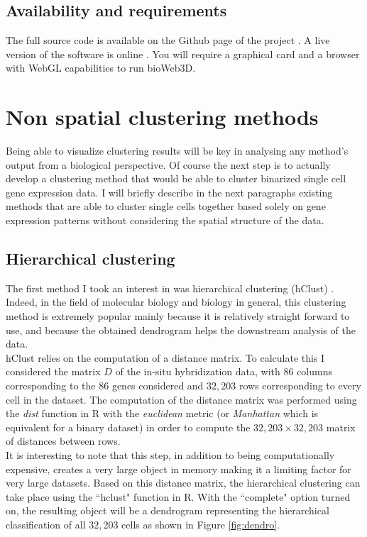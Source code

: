 	\subsection{Availability and requirements}
The full source code is available on the Github page of the project \cite{github}. A live version of the software is online \cite{bioWeb3D}. You will require a graphical card and a browser with WebGL capabilities to run bioWeb3D.

\section{Non spatial clustering methods}
Being able to visualize clustering results will be key in analysing any method's output from a biological perspective. Of course the next step is to actually develop a clustering method that would be able to cluster binarized single cell gene expression data. I will briefly describe in the next paragraphs existing methods that are able to cluster single cells together based solely on gene expression patterns without considering the spatial structure of the data.
	\subsection{Hierarchical clustering}
	The first method I took an interest in was hierarchical clustering (hClust) \cite{johnson67}. Indeed, in the field of molecular biology and biology in general, this clustering method is extremely popular mainly because it is relatively straight forward to use, and because the obtained dendrogram helps the downstream analysis of the data.\\
	
	hClust relies on the computation of a distance matrix. To calculate this I considered the matrix $D$ of the in-situ hybridization data, with $86$ columns corresponding to the 86 genes considered and $32,203$ rows corresponding to every cell in the dataset. The computation of the distance matrix was performed using the \emph{dist} function in R with the \emph{euclidean} metric (or \emph{Manhattan} which is equivalent for a binary dataset) in order to compute the $32,203 \times 32,203$ matrix of distances between rows.\\
	
	It is interesting to note that this step, in addition to being computationally expensive, creates a very large object in memory making it a limiting factor for very large datasets. Based on this distance matrix, the hierarchical clustering can take place using the ``hclust" function in R. With the ``complete" option turned on, the resulting object will be a dendrogram  representing the hierarchical classification of all $32,203$ cells as shown in Figure \ref{fig:dendro}.\\
	
